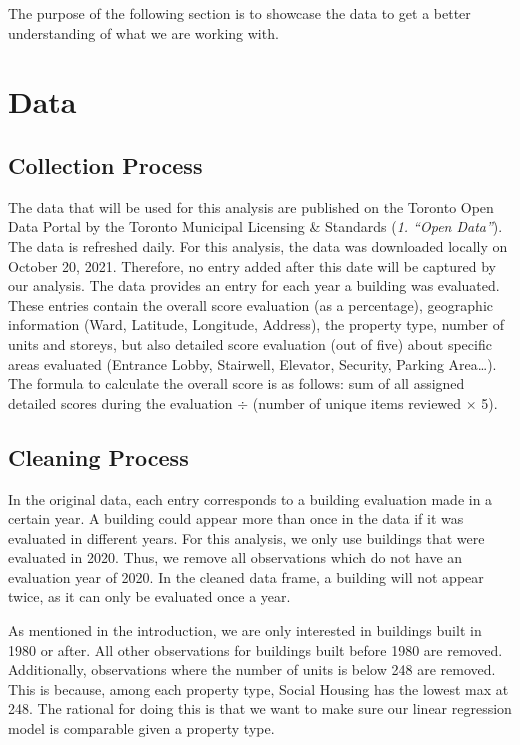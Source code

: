 \documentclass[
]{article}
\begin{document}
The purpose of the following section is to showcase the data to get a
better understanding of what we are working with.

\hypertarget{data}{%
\section{Data}\label{data}}

\hypertarget{collection-process}{%
\subsection{Collection Process}\label{collection-process}}

The data that will be used for this analysis are published on the
Toronto Open Data Portal by the Toronto Municipal Licensing \& Standards
(\emph{1. ``Open Data''}). The data is refreshed daily. For this
analysis, the data was downloaded locally on October 20, 2021.
Therefore, no entry added after this date will be captured by our
analysis. The data provides an entry for each year a building was
evaluated. These entries contain the overall score evaluation (as a
percentage), geographic information (Ward, Latitude, Longitude,
Address), the property type, number of units and storeys, but also
detailed score evaluation (out of five) about specific areas evaluated
(Entrance Lobby, Stairwell, Elevator, Security, Parking Area\ldots). The
formula to calculate the overall score is as follows: sum of all
assigned detailed scores during the evaluation \(\div\) (number of
unique items reviewed \(\times\) 5).

\hypertarget{cleaning-process}{%
\subsection{Cleaning Process}\label{cleaning-process}}

In the original data, each entry corresponds to a building evaluation
made in a certain year. A building could appear more than once in the
data if it was evaluated in different years. For this analysis, we only
use buildings that were evaluated in 2020. Thus, we remove all
observations which do not have an evaluation year of 2020. In the
cleaned data frame, a building will not appear twice, as it can only be
evaluated once a year.

As mentioned in the introduction, we are only interested in buildings
built in 1980 or after. All other observations for buildings built
before 1980 are removed. Additionally, observations where the number of
units is below 248 are removed. This is because, among each property
type, Social Housing has the lowest max at 248. The rational for doing
this is that we want to make sure our linear regression model is
comparable given a property type.
\end{document}
